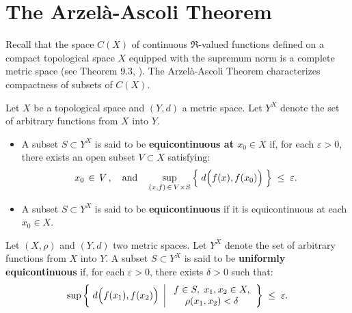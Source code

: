 

\section{The Arzel\`{a}-Ascoli Theorem}
\setcounter{theorem}{0}
\setcounter{equation}{0}

\renewcommand{\theenumi}{\roman{enumi}}
\renewcommand{\labelenumi}{\textnormal{(\theenumi)}$\;\;$}

Recall that the space $C(X)$ of continuous $\Re$-valued functions defined
on a compact topological space $X$ equipped with the supremum norm
is a complete metric space (see Theorem 9.3, \cite{Aliprantis1998}).
The Arzel\`{a}-Ascoli Theorem characterizes compactness of subsets of $C(X)$.

\begin{definition}[Equicontinuity]
\mbox{}\vskip 0.1cm
\noindent
Let $X$ be a topological space and $(Y,d)$ a metric space.
Let $Y^{X}$ denote the set of arbitrary functions from $X$ into $Y$.
\begin{itemize}
\item	A subset $S \subset Y^{X}$ is said to be \textbf{equicontinuous at $x_{0} \in X$} if,
		for each $\varepsilon > 0$, there exists an open subset $V \subset X$ satisfying:
		\begin{equation*}
		x_{0} \,\in\, V\,,
		\quad\textnormal{and}\quad
		\sup_{(x,f) \,\in\, V \times S}\left\{\;d\!\left(\overset{{\color{white}.}}{f}(x),f(x_{0})\right)\;\right\}
		\;\leq\; \varepsilon.
		\end{equation*}
\item	A subset $S \subset Y^{X}$ is said to be \textbf{equicontinuous} if it is equicontinuous at each $x_{0} \in X$.
\end{itemize}
\end{definition}

\begin{definition}
\mbox{}\vskip 0.1cm
\noindent
Let $(X,\rho)$ and $(Y,d)$ two metric spaces.
Let $Y^{X}$ denote the set of arbitrary functions from $X$ into $Y$.
A subset $S \subset Y^{X}$ is said to be \textbf{uniformly equicontinuous} if,
for each $\varepsilon > 0$, there exists $\delta > 0$ such that:
\begin{equation*}
\sup\left\{\;
d\!\left(\overset{{\color{white}.}}{f}(x_{1}),f(x_{2})\right)
\;\left\vert\;
\begin{array}{c} f \in S, \; x_{1},x_{2} \in X, \\ \rho(x_{1},x_{2}) < \delta \end{array}
\right.
\right\}
\;\leq\; \varepsilon.
\end{equation*}
\end{definition}

